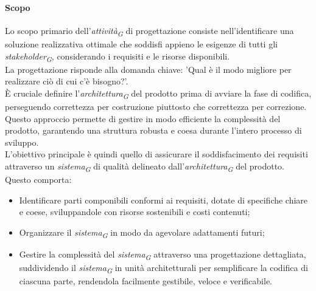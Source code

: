 \paragraph{Scopo}
Lo scopo primario dell'\textit{attività}\textsubscript{\textit{G}} di progettazione consiste nell'identificare una soluzione realizzativa ottimale che soddisfi appieno le esigenze di tutti gli \textit{stakeholder}\textsubscript{\textit{G}}, considerando i requisiti e le risorse disponibili. \\
La progettazione risponde alla domanda chiave: 'Qual è il modo migliore per realizzare ciò di cui c'è bisogno?'. \\
È cruciale definire l'\textit{architettura}\textsubscript{\textit{G}} del prodotto prima di avviare la fase di codifica, perseguendo correttezza per costruzione piuttosto che correttezza per correzione. Questo approccio permette di gestire in modo efficiente la complessità del prodotto, garantendo una struttura robusta e coesa durante l'intero processo di sviluppo. \\
L'obiettivo principale è quindi quello di assicurare il soddisfacimento dei requisiti attraverso un \textit{sistema}\textsubscript{\textit{G}} di qualità delineato dall'\textit{architettura}\textsubscript{\textit{G}} del prodotto. Questo comporta:
\begin{itemize}
    \item Identificare parti componibili conformi ai requisiti, dotate di specifiche chiare e coese, sviluppandole con risorse sostenibili e costi contenuti;
    \item Organizzare il \textit{sistema}\textsubscript{\textit{G}} in modo da agevolare adattamenti futuri;
    \item Gestire la complessità del \textit{sistema}\textsubscript{\textit{G}} attraverso una progettazione dettagliata, suddividendo il \textit{sistema}\textsubscript{\textit{G}} in unità architetturali per semplificare la codifica di ciascuna parte, rendendola facilmente gestibile, veloce e verificabile.
\end{itemize}

